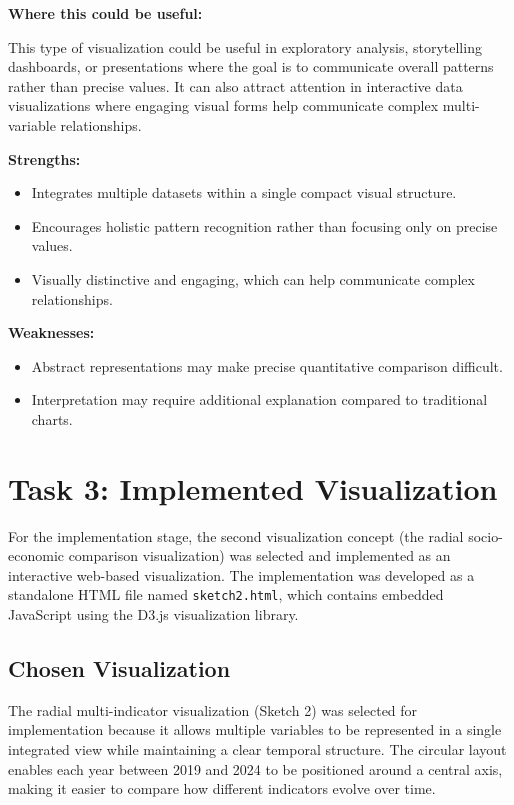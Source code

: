 \documentclass[11pt,a4paper]{article}
\begin{document}
\textbf{Where this could be useful:}

This type of visualization could be useful in exploratory analysis, storytelling dashboards, or presentations where the goal is to communicate overall patterns rather than precise values. It can also attract attention in interactive data visualizations where engaging visual forms help communicate complex multi-variable relationships.

\textbf{Strengths:}
\begin{itemize}[leftmargin=1.5em]
    \item Integrates multiple datasets within a single compact visual structure.
    \item Encourages holistic pattern recognition rather than focusing only on precise values.
    \item Visually distinctive and engaging, which can help communicate complex relationships.
\end{itemize}

\textbf{Weaknesses:}
\begin{itemize}[leftmargin=1.5em]
    \item Abstract representations may make precise quantitative comparison difficult.
    \item Interpretation may require additional explanation compared to traditional charts.
\end{itemize}
\section{Task 3: Implemented Visualization}

For the implementation stage, the second visualization concept (the radial socio-economic comparison visualization) was selected and implemented as an interactive web-based visualization. The implementation was developed as a standalone HTML file named \texttt{sketch2.html}, which contains embedded JavaScript using the D3.js visualization library.

\subsection{Chosen Visualization}

The radial multi-indicator visualization (Sketch 2) was selected for implementation because it allows multiple variables to be represented in a single integrated view while maintaining a clear temporal structure. The circular layout enables each year between 2019 and 2024 to be positioned around a central axis, making it easier to compare how different indicators evolve over time.
\end{document}
